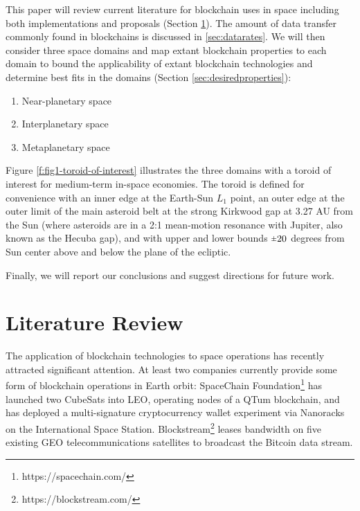 \documentclass[journal ]{new-aiaa}
\newcommand{\rpm}{\raisebox{.2ex}{$\scriptstyle\pm$}} %
\begin{document}
This paper will review current literature for blockchain uses in space including both implementations and proposals (Section \ref{sec:litreview}). The amount of data transfer commonly found in blockchains is discussed in \ref{sec:datarates}. We will then consider three space domains and map extant blockchain properties to each domain to bound the applicability of extant blockchain technologies and determine best fits in the domains (Section \ref{sec:desiredproperties}): 
\begin{enumerate} %
\item Near-planetary space
\item Interplanetary space
\item Metaplanetary space
\end{enumerate}

Figure \ref{f:fig1-toroid-of-interest} illustrates the three domains with a toroid of interest for medium-term in-space economies. The toroid is defined for convenience with an inner edge at the Earth-Sun $L_{1}$ point, an outer edge at the outer limit of the main asteroid belt at the strong Kirkwood gap at 3.27 AU from the Sun (where asteroids are in a 2:1 mean-motion resonance with Jupiter, also known as the Hecuba gap), and with upper and lower bounds $\rpm 20$ degrees from Sun center above and below the plane of the ecliptic.

Finally, we will report our conclusions and suggest directions for future work.


\section{Literature Review}\label{sec:litreview}

The application of blockchain technologies to space operations has recently attracted significant attention. At least two companies currently provide some form of blockchain operations in Earth orbit: SpaceChain Foundation\footnote{https://spacechain.com/} has launched two CubeSats into LEO, operating nodes of a QTum blockchain, and has deployed a multi-signature cryptocurrency wallet experiment via Nanoracks on the International Space Station. Blockstream\footnote{https://blockstream.com/} leases bandwidth on five existing GEO telecommunications satellites to broadcast the Bitcoin data stream.
\end{document}
